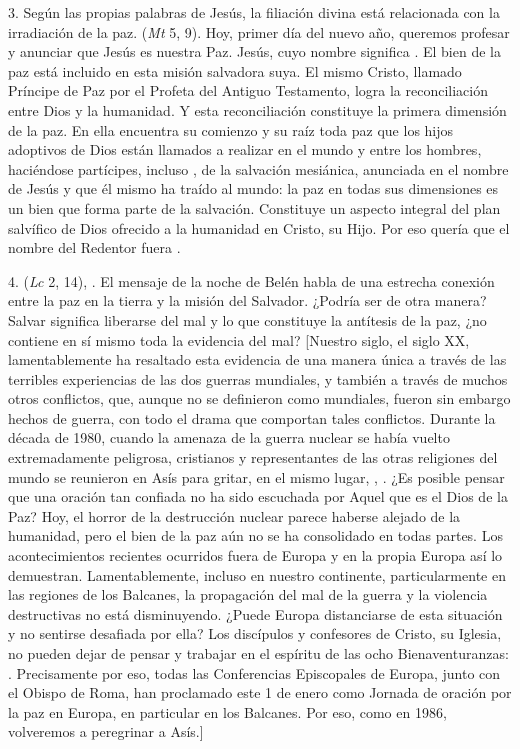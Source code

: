 \begin{body}
	3. Según las propias palabras de Jesús, la filiación divina está relacionada con la irradiación de la paz.  (\emph{Mt} 5, 9). Hoy, primer día del nuevo año, queremos profesar y anunciar que Jesús es nuestra Paz. Jesús, cuyo nombre significa . El bien de la paz está incluido en esta misión salvadora suya. El mismo Cristo, llamado Príncipe de Paz por el Profeta del Antiguo Testamento, logra la reconciliación entre Dios y la humanidad. Y esta reconciliación constituye la primera dimensión de la paz. En ella encuentra su comienzo y su raíz toda paz que los hijos adoptivos de Dios están llamados a realizar en el mundo y entre los hombres, haciéndose partícipes, incluso , de la salvación mesiánica, anunciada en el nombre de Jesús y que él mismo ha traído al mundo: la paz en todas sus dimensiones es un bien que forma parte de la salvación. Constituye un aspecto integral del plan salvífico de Dios ofrecido a la humanidad en Cristo, su Hijo. Por eso quería que el nombre del Redentor fuera .
	
	4.  (\emph{Lc} 2, 14), . El mensaje de la noche de Belén habla de una estrecha conexión entre la paz en la tierra y la misión del Salvador. ¿Podría ser de otra manera? Salvar significa liberarse del mal y lo que constituye la antítesis de la paz, ¿no contiene en sí mismo toda la evidencia del mal? {[}Nuestro siglo, el siglo XX, lamentablemente ha resaltado esta evidencia de una manera única a través de las terribles experiencias de las dos guerras mundiales, y también a través de muchos otros conflictos, que, aunque no se definieron como mundiales, fueron sin embargo hechos de guerra, con todo el drama que comportan tales conflictos. Durante la década de 1980, cuando la amenaza de la guerra nuclear se había vuelto extremadamente peligrosa, cristianos y representantes de las otras religiones del mundo se reunieron en Asís para gritar, en el mismo lugar, , . ¿Es posible pensar que una oración tan confiada no ha sido escuchada por Aquel que es el Dios de la Paz? Hoy, el horror de la destrucción nuclear parece haberse alejado de la humanidad, pero el bien de la paz aún no se ha consolidado en todas partes. Los acontecimientos recientes ocurridos fuera de Europa y en la propia Europa así lo demuestran. Lamentablemente, incluso en nuestro continente, particularmente en las regiones de los Balcanes, la propagación del mal de la guerra y la violencia destructivas no está disminuyendo. ¿Puede Europa distanciarse de esta situación y no sentirse desafiada por ella? Los discípulos y confesores de Cristo, su Iglesia, no pueden dejar de pensar y trabajar en el espíritu de las ocho Bienaventuranzas: . Precisamente por eso, todas las Conferencias Episcopales de Europa, junto con el Obispo de Roma, han proclamado este 1 de enero como Jornada de oración por la paz en Europa, en particular en los Balcanes. Por eso, como en 1986, volveremos a peregrinar a Asís.{]}
	

\end{body}

